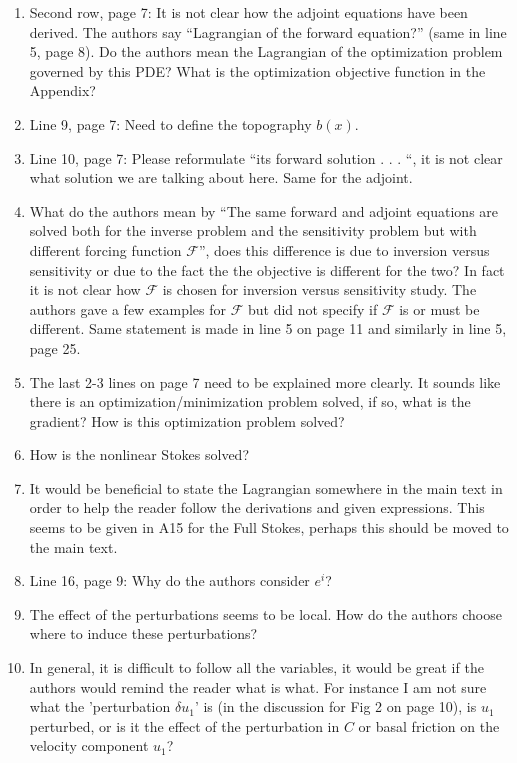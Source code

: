 \documentclass{article}
\begin{document}
\begin{enumerate}
    \item Second row, page 7: It is not clear how the adjoint equations have been derived. The authors say “Lagrangian of the forward equation?” (same in line 5, page 8). Do the authors mean the Lagrangian of the optimization problem governed by this PDE? What is the optimization objective function in the Appendix?
    
    \item Line 9, page 7: Need to define the topography $b(x)$.

    \item Line 10, page 7: Please reformulate “its forward solution . . . “, it is not clear what solution we are talking about here. Same for the adjoint.
    
    \item What do the authors mean by “The same forward and adjoint equations are solved both for the inverse problem and the sensitivity problem but with different forcing function $\mathcal{F}$”, does this difference is due to inversion versus sensitivity or due to the fact the the objective is different for the two? In fact it is not clear how $\mathcal{F}$ is chosen for inversion versus sensitivity study. The authors gave a few examples for $\mathcal{F}$ but did not specify if $\mathcal{F}$ is or must be different. Same statement is made in line 5 on page 11 and similarly in line 5, page 25.
    
    \item The last 2-3 lines on page 7 need to be explained more clearly. It sounds like there is an optimization/minimization problem solved, if so, what is the gradient? How is this optimization problem solved?
    
    \item How is the nonlinear Stokes solved?

    \item It would be beneficial to state the Lagrangian somewhere in the main text in order to help the reader follow the derivations and given expressions. This seems to be given in A15 for the Full Stokes, perhaps this should be moved to the main text.

    \item Line 16, page 9: Why do the authors consider $e^i$?
    
    \item The effect of the perturbations seems to be local. How do the authors choose where to induce these perturbations?

    \item In general, it is difficult to follow all the variables, it would be great if the authors would remind the reader what is what. For instance I am not sure what the 'perturbation $\delta u_1$' is (in the discussion for Fig 2 on page 10), is $u_1$ perturbed, or is it the effect of the perturbation in $C$ or basal friction on the velocity component $u_1$?
    

\end{enumerate}
\end{document}
